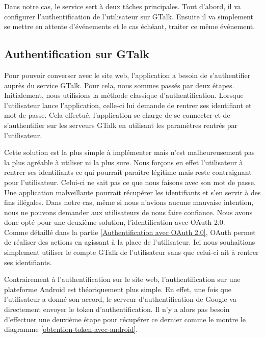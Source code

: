 Dans notre cas, le service sert à deux tâches principales. Tout d'abord, il va configurer l'authentification
de l'utilisateur sur GTalk. Ensuite il va simplement se mettre en attente d'événements et le cas échéant, 
traiter ce même événement.



\subsection{Authentification sur GTalk}

Pour pouvoir converser avec le site web, l'application a besoin de s'authentifier auprès du service
GTalk. Pour cela, nous sommes passés par deux étapes. 
\\


Initialement, nous utilisions la méthode classique d'authentification. Lorsque l'utilisateur lance 
l'application, celle-ci lui demande de rentrer ses identifiant et mot de passe. Cela effectué, 
l'application se charge de se connecter et de s'authentifier sur les serveurs GTalk en utilisant les
paramètres rentrés par l'utilisateur.

Cette solution est la plus simple à implémenter mais n'est malheureusement pas la plus agréable
à utiliser ni la plus sure. Nous forçons en effet l'utilisateur à rentrer ses identifiants ce qui 
pourrait paraître légitime mais reste contraignant pour l'utilisateur. Celui-ci ne sait pas ce que 
nous faisons avec son mot de passe. Une application malveillante pourrait récupérer les identifiants
et s'en servir à des fins illégales. Dans notre cas, même si nous n'avions aucune mauvaise intention,
nous ne pouvons demander aux utilisateurs de nous faire confiance. Nous avons donc opté pour une 
deuxième solution, l'identification avec OAuth 2.0.
\\


Comme détaillé dans la partie \ref{Authentification avec OAuth 2.0}, OAuth permet de réaliser des actions en agissant à la place de l'utilisateur. 
Ici nous souhaitions simplement utiliser le compte GTalk de l'utilisateur sans que celui-ci ait à rentrer
ses identifiants. 

Contrairement à l'authentification sur le site web, l'authentification sur une plateforme Android est
théoriquement plus simple. En effet, une fois que l'utilisateur a donné son accord, le serveur 
d'authentification de Google va directement envoyer le token d'authentification. Il n'y a alors pas 
besoin d'effectuer une deuxième étape pour récupérer ce dernier comme le montre le diagramme 
\ref{obtention-token-avec-android}.

